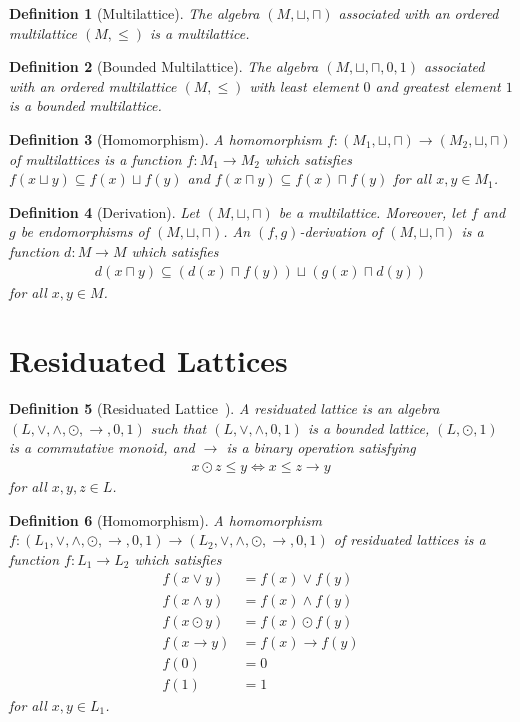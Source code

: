 \documentclass{article}
\newtheorem{definition}{Definition}
\begin{document}
\begin{definition}[Multilattice]
The algebra $(M,\sqcup,\sqcap)$ associated with an ordered multilattice $(M,\leq)$ is a \emph{multilattice}.
\end{definition}

\begin{definition}[Bounded Multilattice]
The algebra $(M,\sqcup,\sqcap,0,1)$ associated with an ordered multilattice $(M,\leq)$ with least element $0$ and greatest element $1$
is a \emph{bounded multilattice}.
\end{definition}

\begin{definition}[Homomorphism]
A \emph{homomorphism} $f:(M_1,\sqcup,\sqcap) \rightarrow (M_2,\sqcup,\sqcap)$ of multilattices is a function $f:M_1 \rightarrow M_2$ which satisfies
$f(x \sqcup y) \subseteq f(x) \sqcup f(y)$ and $f(x \sqcap y) \subseteq f(x) \sqcap f(y)$ for all $x,y \in M_1$.
\end{definition}

\begin{definition}[Derivation]
Let $(M,\sqcup,\sqcap)$ be a multilattice. Moreover, let $f$ and $g$ be endomorphisms of $(M,\sqcup,\sqcap)$.
An \emph{$(f,g)$-derivation} of $(M,\sqcup,\sqcap)$ is a function $d:M \rightarrow M$ which satisfies
\begin{align}
d(x \sqcap y) \subseteq (d(x) \sqcap f(y)) \sqcup (g(x) \sqcap d(y))
\end{align}
for all $x,y \in M$.
\end{definition}

\section{Residuated Lattices}
\label{rela0}
\begin{definition}[Residuated Lattice~\cite{Pic21}]
A \emph{residuated lattice} is an algebra $(L,\vee,\wedge,\odot,\rightarrow,0,1)$ such that $(L,\vee,\wedge,0,1)$
is a bounded lattice, $(L,\odot,1)$ is a commutative monoid, and $\rightarrow$ is a binary operation satisfying
\begin{align}
x \odot z \leq y \Leftrightarrow x \leq z \rightarrow y
\end{align}
for all $x,y,z \in L$.
\end{definition}

\begin{definition}[Homomorphism]
A \emph{homomorphism} $f:(L_1,\vee,\wedge,\odot,\rightarrow,0,1) \rightarrow (L_2,\vee,\wedge,\odot,\rightarrow,0,1)$ of residuated lattices
is a function $f:L_1 \rightarrow L_2$ which satisfies
\begin{align}
f(x \vee y) &= f(x) \vee f(y) \\
f(x \wedge y) &= f(x) \wedge f(y) \\
f(x \odot y) &= f(x) \odot f(y) \\
f(x \rightarrow y) &= f(x) \rightarrow f(y) \\
f(0) &= 0 \\
f(1) &= 1
\end{align}
for all $x,y \in L_1$.
\end{definition}
\end{document}

